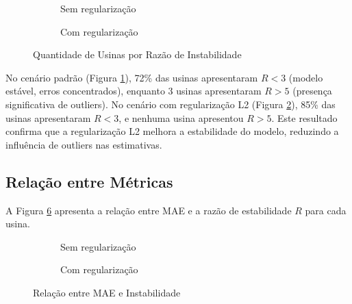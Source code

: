 \begin{figure}[H]
    \centering
    \begin{subfigure}{0.6\textwidth}
        \centering
        
        \caption{Sem regularização}
        \label{fig:dist_inst_padrao}
    \end{subfigure}
    
    \vspace{0.5cm}
    
    \begin{subfigure}{0.6\textwidth}
        \centering
        
        \caption{Com regularização}
        \label{fig:dist_inst_L2}
    \end{subfigure}
    \caption{Quantidade de Usinas por Razão de Instabilidade}
    \label{fig:dist_instab}
\end{figure}

No cenário padrão (Figura \ref{fig:dist_inst_padrao}), 72\% das usinas apresentaram \(R < 3\) (modelo estável, erros concentrados), enquanto 3 usinas apresentaram \(R > 5\) (presença significativa de outliers). No cenário com regularização L2 (Figura \ref{fig:dist_inst_L2}), 85\% das usinas apresentaram \(R < 3\), e nenhuma usina apresentou \(R > 5\). Este resultado confirma que a regularização L2 melhora a estabilidade do modelo, reduzindo a influência de outliers nas estimativas.

\subsection{Relação entre Métricas}

A Figura \ref{fig:mae_X_inst} apresenta a relação entre \ac{MAE} e a razão de estabilidade \(R\) para cada usina.

\begin{figure}[H]
    \centering
    \begin{subfigure}{0.6\textwidth}
        \centering
        
        \caption{Sem regularização}
        \label{fig:mae_inst_padrao}
    \end{subfigure}
    
    \vspace{0.5cm}
    
    \begin{subfigure}{0.6\textwidth}
        \centering
        
        \caption{Com regularização}
        \label{fig:mae_inst_l2}
    \end{subfigure}
    \caption{Relação entre MAE e Instabilidade}
    \label{fig:mae_X_inst}
\end{figure}

